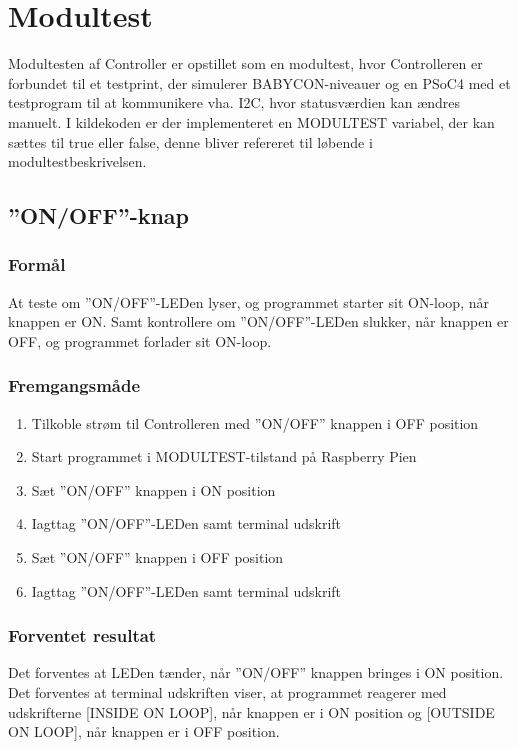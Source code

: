 \newpage
\section{Modultest}

Modultesten af Controller er opstillet som en modultest, hvor Controlleren er forbundet til et testprint, der simulerer BABYCON-niveauer og en PSoC4 med et testprogram til at kommunikere vha. I2C, hvor statusværdien kan ændres manuelt. I kildekoden er der implementeret en MODULTEST variabel, der kan sættes til true eller false, denne bliver refereret til løbende i modultestbeskrivelsen.

\subsection*{''ON/OFF''-knap}

\subsubsection*{Formål}

At teste om ''ON/OFF''-LEDen lyser, og programmet starter sit ON-loop, når knappen er ON. Samt kontrollere om ''ON/OFF''-LEDen slukker, når knappen er OFF, og programmet forlader sit ON-loop.

\subsubsection*{Fremgangsmåde}
\begin{enumerate}
\item Tilkoble strøm til Controlleren med ''ON/OFF'' knappen i OFF position
\item Start programmet i MODULTEST-tilstand på Raspberry Pien
\item Sæt ''ON/OFF'' knappen i ON position
\item Iagttag ''ON/OFF''-LEDen samt terminal udskrift
\item Sæt ''ON/OFF'' knappen i OFF position
\item Iagttag ''ON/OFF''-LEDen samt terminal udskrift
\end{enumerate}

\subsubsection*{Forventet resultat} 
Det forventes at LEDen tænder, når ''ON/OFF'' knappen bringes i ON position. Det forventes at terminal udskriften viser, at programmet reagerer med udskrifterne [INSIDE ON LOOP], når knappen er i ON position og [OUTSIDE ON LOOP], når knappen er i OFF position.

